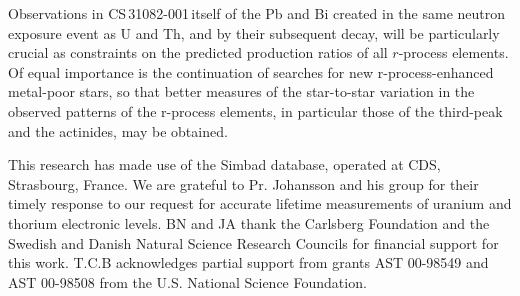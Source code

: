 \documentclass{aa}
\def\cs{CS\,31082-001\,}
\begin{document}
Observations in \cs itself of the Pb and Bi created in the same neutron
exposure event as U and Th, and by their subsequent decay, will be
particularly crucial as constraints on the predicted production ratios of
all $r$-process elements.  Of equal importance is the continuation of searches
for new r-process-enhanced metal-poor stars, so that better measures of the
star-to-star variation in the observed patterns of the r-process elements, in
particular those of the third-peak and the actinides, may be obtained.

\begin{acknowledgements}
This research has made use of the Simbad database,
operated at CDS, Strasbourg, France. We are grateful to Pr. Johansson and his 
group for their timely response to our request for accurate lifetime 
measurements of uranium and thorium electronic levels.   
BN and JA thank the Carlsberg Foundation and the Swedish and Danish Natural
Science Research Councils for financial support for this work.  T.C.B
acknowledges partial support from grants AST 00-98549 and AST 00-98508 from
the U.S. National Science Foundation.
\end{acknowledgements}
\end{document}
